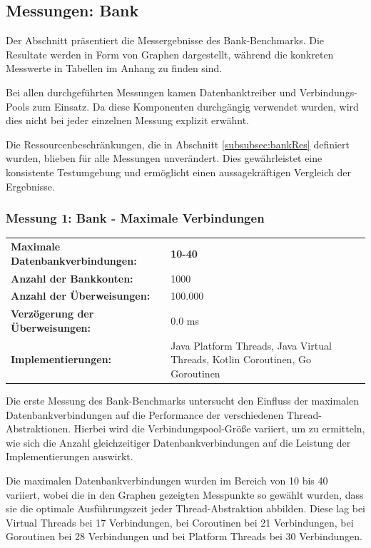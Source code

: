 \documentclass[fontsize=12pt,paper=a4,twoside=semi,parskip=half-,headsepline,headinclude]{scrreprt}
\begin{document}
\subsection{Messungen: Bank}

Der Abschnitt präsentiert die Messergebnisse des Bank-Benchmarks. Die Resultate werden in Form von Graphen dargestellt, während die konkreten Messwerte in Tabellen im Anhang zu finden sind.

Bei allen durchgeführten Messungen kamen Datenbanktreiber und Verbindungs-Pools zum Einsatz. Da diese Komponenten durchgängig verwendet wurden, wird dies nicht bei jeder einzelnen Messung explizit erwähnt.

Die Ressourcenbeschränkungen, die in Abschnitt \ref{subsubsec:bankRes} definiert wurden, blieben für alle Messungen unverändert. Dies gewährleistet eine konsistente Testumgebung und ermöglicht einen aussagekräftigen Vergleich der Ergebnisse.

\subsubsection{Messung 1: Bank - Maximale Verbindungen}

\begin{tabularx}{\textwidth}{@{}lX@{}}
	\textbf{Maximale Datenbankverbindungen:} & \textbf{10-40} \\
	\textbf{Anzahl der Bankkonten:} & 1000 \\
	\textbf{Anzahl der Überweisungen:} & 100.000 \\
	\textbf{Verzögerung der Überweisungen:} & 0.0 ms \\
	\textbf{Implementierungen:} & Java Platform Threads, Java Virtual Threads, Kotlin Coroutinen, Go Goroutinen
\end{tabularx}

Die erste Messung des Bank-Benchmarks untersucht den Einfluss der maximalen Datenbankverbindungen auf die Performance der verschiedenen Thread-Abstraktionen. Hierbei wird die Verbindungspool-Größe variiert, um zu ermitteln, wie sich die Anzahl gleichzeitiger Datenbankverbindungen auf die Leistung der Implementierungen auswirkt.

Die maximalen Datenbankverbindungen wurden im Bereich von 10 bis 40 variiert, wobei die in den Graphen gezeigten Messpunkte so gewählt wurden, dass sie die optimale Ausführungszeit jeder Thread-Abstraktion abbilden. Diese lag bei Virtual Threads bei 17 Verbindungen, bei Coroutinen bei 21 Verbindungen, bei Goroutinen bei 28 Verbindungen und bei Platform Threads bei 30 Verbindungen.
\end{document}
